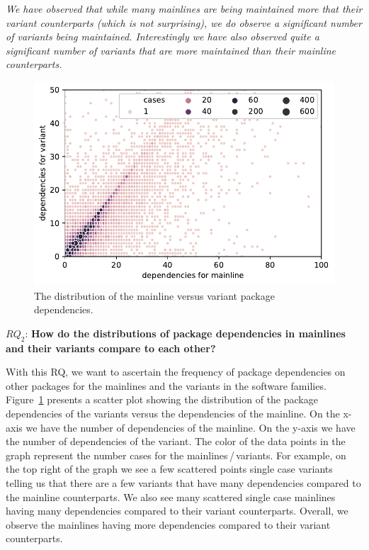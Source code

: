 \begin{framed}
\noindent
\emph{We have observed that while many mainlines are being maintained more that their variant counterparts (which is not surprising), we do observe a significant number of variants being maintained. Interestingly we have also observed quite a significant number of variants that are more maintained than their mainline counterparts.}
\end{framed}

\begin{figure}[htbp]
\vspace{-.3cm}
   \centering
    \includegraphics[scale=0.6]{figures/benevolj_dependencies.pdf}
    \caption{The distribution of the mainline versus variant package dependencies.}
    \label{fig:dependencies}
\end{figure}


$RQ_2$: \textbf{How do the distributions of package dependencies in mainlines and their variants compare to each other?}

With this RQ, we want to ascertain the frequency of package dependencies on other packages for the mainlines and the variants in the software families. 
Figure~\ref{fig:dependencies} presents a scatter plot showing the distribution of the package dependencies of the variants versus the dependencies of the mainline.
On the x-axis we have the number of dependencies of the mainline. 
On the y-axis we have the number of dependencies of the variant.
The color of the data points in the graph represent the number cases for the mainlines\,/\,variants.
For example, on the top right of the graph we see a few scattered points single case variants telling us that there are a few variants that have many dependencies compared to the mainline counterparts.
We also see many scattered single case mainlines having many dependencies compared to their variant counterparts. 
Overall, we observe the mainlines having more dependencies compared to their variant counterparts.

